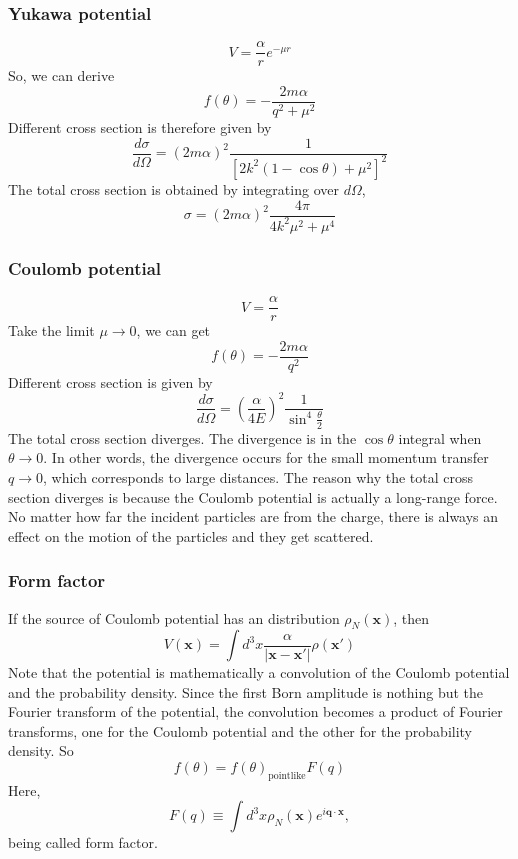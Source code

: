 \documentclass[cyan]{elegantnote}
\begin{document}
\subsubsection{Yukawa potential}
\[V = \frac{\alpha}{r}  e^{-\mu r}\]
So, we can derive
\[f(\theta) = - \frac{2m\alpha}{q^2 + \mu^2}\]
Different cross section is therefore given by
\[\frac{d\sigma}{d\Omega} = (2m\alpha)^2 \frac{1}{[2k^2(1-\cos\theta) + \mu^2]^2}\]
The total cross section is obtained by integrating over $d\Omega$,
\[\sigma = (2m\alpha)^2 \frac{4\pi}{4k^2\mu^2 + \mu^4}\]

\subsubsection{Coulomb potential}
\[V = \frac{\alpha}{r}\]
Take the limit $\mu \to 0$, we can get
\[f(\theta) = - \frac{2m\alpha}{q^2}\]
Different cross section is given by
\[\frac{d\sigma}{d\Omega} = (\frac{\alpha}{4E})^2 \frac{1}{\sin^4{\frac{\theta}{2}}}\]
The total cross section diverges. The divergence is in the $\cos\theta$ integral when $\theta \to 0$. In other words, the divergence occurs for the small momentum transfer $q \to 0$, which corresponds to large distances.
The reason why the total cross section diverges is because the Coulomb potential is actually a long-range force. No matter how far the incident particles are from the charge, there is always an effect on the motion of the particles and they get scattered.

\subsubsection{Form factor}
\noindent
If the source of Coulomb potential has an distribution $\rho_N(\mathbf{x})$, then
\[V(\mathbf{x}) = \int d^3x \frac{\alpha}{|\mathbf{x}-\mathbf{x}'|} \rho(\mathbf{x}')\]
Note that the potential is mathematically a convolution of the Coulomb potential and the probability density. Since the first Born amplitude is nothing but the Fourier transform of the potential, the convolution becomes a product of Fourier transforms, one for the Coulomb potential and the other for the probability density. So
\[f(\theta) = f(\theta)_{\mathrm{pointlike}} F(q)\]
Here,
\[F(q) \equiv \int d^3x \rho_N(\mathbf{x}) e^{i \mathbf{q} \cdot \mathbf{x}},\]
being called form factor.
\end{document}
